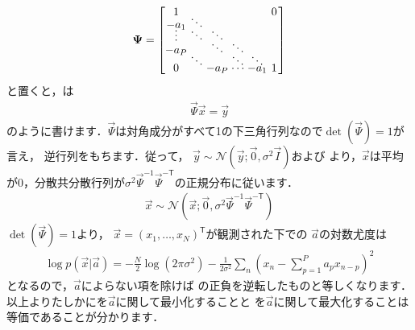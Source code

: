 \begin{align}
\Vec{\Psi} = 
\begin{bmatrix}
\hspace{-0ex}1& & & & &\hspace{-1.7ex}0\vspace{-1.7ex}\\
\hspace{-0ex}-a_1&\hspace{-1.7ex}\ddots& & & &\vspace{-1.7ex}\\
\hspace{-0ex}\vdots&\hspace{-1.7ex}\ddots&\hspace{-1.7ex}\ddots& & &\vspace{-1.7ex}\\
\hspace{-0ex}-a_P& &\hspace{-1.7ex}\ddots &\hspace{-1.7ex}\ddots& &\vspace{-1.7ex}\\
 &\hspace{-1.7ex}\ddots& &\hspace{-1.7ex}\ddots&\hspace{-1.7ex}\ddots&\vspace{-1.7ex}\\
\hspace{-0ex}0 & &\hspace{-1.7ex}-a_P&\hspace{-1.7ex}\cdots&\hspace{-1.7ex}-a_1&\hspace{-1.7ex}1
\end{bmatrix}
\label{eq:Psi}
\end{align}
と置くと，は
\begin{align}
\Vec{\Psi}\Vec{x} =\Vec{y}
\label{eq:AR2}
\end{align}
のように書けます．$\Vec{\Psi}$は対角成分がすべて1の下三角行列なので$\det(\Vec{\Psi})=1$が言え，
逆行列をもちます．従って，
$\Vec{y}\sim \mathcal{N}(\Vec{y};\Vec{0},\sigma^2\Vec{I})$および
より，$\Vec{x}$は平均が0，分散共分散行列が$\sigma^2 \Vec{\Psi}^{-1}\Vec{\Psi}^{-\mathsf T}$の正規分布に従います．
\begin{align}
\Vec{x} \sim \mathcal{N}(\Vec{x};\Vec{0},\sigma^2 \Vec{\Psi}^{-1}\Vec{\Psi}^{-\mathsf T})
\label{eq:s_pdf}
\end{align}
$\det(\Vec{\Psi})=1$より，
$\Vec{x} =(x_1,\ldots,x_N)^{\mathsf T}$が観測された下での
$\Vec{a}$の対数尤度は
\begin{align}
\log p(\Vec{x}|\Vec{a}) 
=
-\frac{N}{2}\log(2\pi\sigma^2)
- 
\frac{1}{2\sigma^2}
\sum_n 
\left(x_n - \sum_{p=1}^{P} a_p x_{n-p}\right)^2
\label{eq:lpc_loglikelihood}
\end{align}
となるので，$\Vec{a}$によらない項を除けば
の正負を逆転したものと等しくなります．
以上よりたしかにを$\Vec{a}$に関して最小化することと
を$\Vec{a}$に関して最大化することは
等価であることが分かります．

